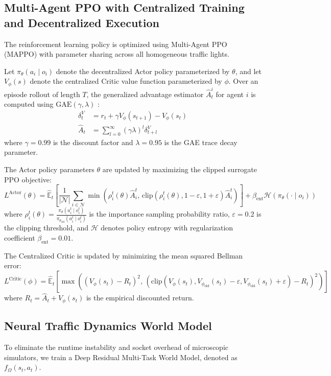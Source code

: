 \subsection{Multi-Agent PPO with Centralized Training and Decentralized Execution}
The reinforcement learning policy is optimized using Multi-Agent PPO (MAPPO) with parameter sharing across all homogeneous traffic lights.

Let $\pi_\theta(a_i \mid o_i)$ denote the decentralized Actor policy parameterized by $\theta$, and let $V_\phi(s)$ denote the centralized Critic value function parameterized by $\phi$. Over an episode rollout of length $T$, the generalized advantage estimator $\hat{A}_t^i$ for agent $i$ is computed using $\text{GAE}(\gamma, \lambda)$ \cite{ref_schulman2015gae}:
\begin{align}
\delta_t^V &= r_t + \gamma V_\phi(s_{t+1}) - V_\phi(s_t) \\
\hat{A}_t &= \sum_{l=0}^\infty (\gamma \lambda)^l \delta_{t+l}^V
\end{align}
where $\gamma = 0.99$ is the discount factor and $\lambda = 0.95$ is the GAE trace decay parameter.

The Actor policy parameters $\theta$ are updated by maximizing the clipped surrogate PPO objective:
\begin{equation}
L^{\text{Actor}}(\theta) = \hat{\mathbb{E}}_t \left[ \frac{1}{|\mathcal{N}|} \sum_{i \in \mathcal{N}} \min\left(\rho_i^t(\theta)\hat{A}_i^t, \, \text{clip}(\rho_i^t(\theta), 1-\varepsilon, 1+\varepsilon)\hat{A}_i^t\right) \right] + \beta_{\text{ent}} \mathcal{H}\left(\pi_\theta(\cdot \mid o_i)\right)
\end{equation}
where $\rho_i^t(\theta) = \frac{\pi_\theta(a_i^t \mid o_i^t)}{\pi_{\theta_{\text{old}}}(a_i^t \mid o_i^t)}$ is the importance sampling probability ratio, $\varepsilon = 0.2$ is the clipping threshold, and $\mathcal{H}$ denotes policy entropy with regularization coefficient $\beta_{\text{ent}} = 0.01$.

The Centralized Critic is updated by minimizing the mean squared Bellman error:
\begin{equation}
L^{\text{Critic}}(\phi) = \hat{\mathbb{E}}_t \left[ \max\left( (V_\phi(s_t) - R_t)^2, \, (\text{clip}(V_\phi(s_t), V_{\phi_{\text{old}}}(s_t) - \varepsilon, V_{\phi_{\text{old}}}(s_t) + \varepsilon) - R_t)^2 \right) \right]
\end{equation}
where $R_t = \hat{A}_t + V_\phi(s_t)$ is the empirical discounted return.

\subsection{Neural Traffic Dynamics World Model}
To eliminate the runtime instability and socket overhead of microscopic simulators, we train a Deep Residual Multi-Task World Model, denoted as $f_\Omega(s_t, a_t)$.

